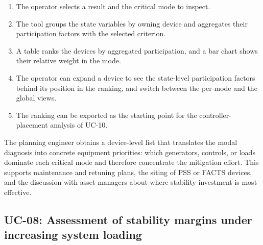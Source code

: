 \begin{description}
\begin{itemize}[before=\leavevmode, leftmargin=*]
        \end{itemize}
  \item[Proposed flow.]
        \begin{enumerate}[before=\leavevmode, leftmargin=*]
          \item The operator selects a result and the critical mode to inspect.
          \item The tool groups the state variables by owning device and aggregates their participation factors with the selected criterion.
          \item A table ranks the devices by aggregated participation, and a bar chart shows their relative weight in the mode.
          \item The operator can expand a device to see the state-level participation factors behind its position in the ranking, and switch between the per-mode and the global views.
          \item The ranking can be exported as the starting point for the controller-placement analysis of UC-10.
        \end{enumerate}
  \item[Expected value.] The planning engineer obtains a device-level list that translates the modal diagnosis into concrete equipment priorities: which generators, controls, or loads dominate each critical mode and therefore concentrate the mitigation effort. This supports maintenance and retuning plans, the siting of PSS or FACTS devices, and the discussion with asset managers about where stability investment is most effective.
\end{description}

\subsection{UC-08: Assessment of stability margins under increasing system loading}

